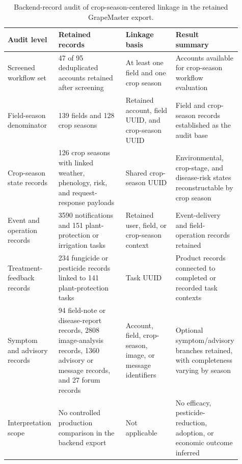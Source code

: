 \documentclass[12pt]{article}
\begin{document}
\begin{table}[H]
\centering
\begingroup
\setlength{\tabcolsep}{3pt}
\renewcommand{\arraystretch}{1.12}
\scriptsize
\caption{Backend-record audit of crop-season-centered linkage in the retained GrapeMaster export.}
\label{tab:backend_operational_coverage}
\begin{minipage}{0.98\linewidth}
\begin{tabular}{p{0.21\linewidth} p{0.30\linewidth} p{0.22\linewidth} p{0.18\linewidth}}
\toprule
Audit level & Retained records & Linkage basis & Result summary \\
\midrule
Screened workflow set & 47 of 95 deduplicated accounts retained after screening & At least one field and one crop season & Accounts available for crop-season workflow evaluation \\
Field-season denominator & 139 fields and 128 crop seasons & Retained account, field UUID, and crop-season UUID & Field and crop-season records established as the audit base \\
Crop-season state records & 126 crop seasons with linked weather, phenology, risk, and request-response payloads & Shared crop-season UUID & Environmental, crop-stage, and disease-risk states reconstructable by crop season \\
Event and operation records & 3590 notifications and 151 plant-protection or irrigation tasks & Retained user, field, or crop-season context & Event-delivery and field-operation records retained \\
Treatment-feedback records & 234 fungicide or pesticide records linked to 141 plant-protection tasks & Task UUID & Product records connected to completed or recorded task contexts \\
Symptom and advisory records & 94 field-note or disease-report records, 2808 image-analysis records, 1360 advisory or message records, and 27 forum records & Account, field, crop-season, image, or message identifiers & Optional symptom/advisory branches retained, with completeness varying by season \\
Interpretation scope & No controlled production comparison in the backend export & Not applicable & No efficacy, pesticide-reduction, adoption, or economic outcome inferred \\
\bottomrule
\end{tabular}
\par\vspace{0.25em}{\raggedright\scriptsize Abbreviation: UUID, universally unique identifier.\par}
\end{minipage}
\endgroup
\end{table}
\end{document}
